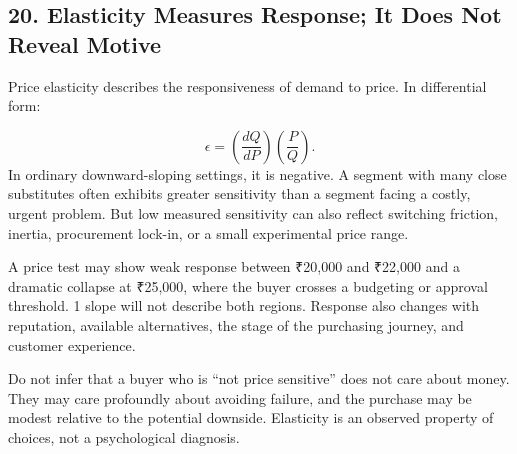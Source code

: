 \subsection*{20. Elasticity Measures Response; It Does Not Reveal Motive}

Price elasticity describes the responsiveness of demand to price. In differential form:

\begin{equation}
\epsilon = \left( \frac{dQ}{dP} \right) \left( \frac{P}{Q} \right).
\end{equation}
In ordinary downward-sloping settings, it is negative. A segment with many close substitutes often exhibits greater sensitivity than a segment facing a costly, urgent problem. But low measured sensitivity can also reflect switching friction, inertia, procurement lock-in, or a small experimental price range.

A price test may show weak response between ₹20,000 and ₹22,000 and a dramatic collapse at ₹25,000, where the buyer crosses a budgeting or approval threshold. 1 slope will not describe both regions. Response also changes with reputation, available alternatives, the stage of the purchasing journey, and customer experience.

Do not infer that a buyer who is ``not price sensitive'' does not care about money. They may care profoundly about avoiding failure, and the purchase may be modest relative to the potential downside. Elasticity is an observed property of choices, not a psychological diagnosis.

